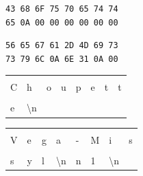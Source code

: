 \documentclass[11pt,a4paper]{article}
\begin{document}
\begin{table}[ht!]
  \centering
  \begin{minipage}{0.4\textwidth}
    \centering
\begin{lstlisting}[style=algorithmique]
43 68 6F 75 70 65 74 74
65 0A 00 00 00 00 00 00
\end{lstlisting}

\begin{lstlisting}[style=algorithmique]
56 65 67 61 2D 4D 69 73
73 79 6C 0A 6E 31 0A 00
\end{lstlisting}

  \end{minipage}
  \hfillx
  \begin{minipage}{0.45\textwidth}
    \centering

\begin{tabular}{ | m{0.45cm} | m{0.45cm} | m{0.45cm} | m{0.45cm}   |   m{0.45cm} | m{0.45cm} | m{0.45cm} | m{0.45cm} | }
\hline
   &   &   &   &   &   &   &   \\
 C & h & o & u & p & e & t & t \\
\hline
   &                   & \cellcolor{black!15} & \cellcolor{black!15} & \cellcolor{black!15} & \cellcolor{black!15} & \cellcolor{black!15} & \cellcolor{black!15} \\
 e & \textbackslash{}n & \cellcolor{black!15} & \cellcolor{black!15} & \cellcolor{black!15} & \cellcolor{black!15} & \cellcolor{black!15} & \cellcolor{black!15} \\
\hline
\end{tabular}

\bigskip

\bigskip

\begin{tabular}{ | m{0.45cm} | m{0.45cm} | m{0.45cm} | m{0.45cm}   |   m{0.45cm} | m{0.45cm} | m{0.45cm} | m{0.45cm} | }
\hline
   &   &   &   &   &   &   &   \\
 V & e & g & a & - & M & i & s \\
\hline
   &   &   &                    & \cellcolor{black!15}   & \cellcolor{black!15}   & \cellcolor{black!15}                   & \cellcolor{black!15} \\
 s & y & l & \textbackslash{}n  & \cellcolor{black!15} n & \cellcolor{black!15} 1 & \cellcolor{black!15} \textbackslash{}n & \cellcolor{black!15} \\
\hline
\end{tabular}

  \end{minipage}
\end{table}
\end{document}
